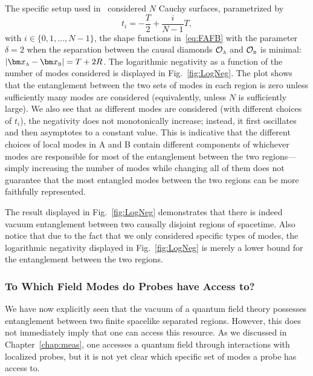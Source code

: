 \documentclass[letterpaper,12pt,titlepage,oneside,final]{book}
\newcommand{\tc}[1]{\textsc{#1}}
\begin{document}
The specific setup used in~\cite{patriciaAndI} considered $N$ Cauchy surfaces, parametrized by
\begin{equation}
    t_i = - \frac{T}{2} + \frac{i}{N-1} T,
\end{equation}
with $i\in \{0,1,...,N-1\}$, the shape functions in~\eqref{eq:FAFB} with the parameter $\delta = 2$ when the separation between the causal diamonds $\mathcal{O}_\tc{a}$ and $\mathcal{O}_\tc{b}$ is minimal: $|\bm x_\tc{a} - \bm x_\tc{b}| = T + 2R$. The logarithmic negativity as a function of the number of modes considered is displayed in Fig.~\ref{fig:LogNeg}. The plot shows that the entanglement between the two sets of modes in each region is zero unless sufficiently many modes are considered (equivalently, unless $N$ is sufficiently large). We also see that as different modes are considered (with different choices of $t_i$), the negativity does not monotonically increase; instead, it first oscillates and then asymptotes to a constant value. This is indicative that the different choices of local modes in A and B contain different components of whichever modes are responsible for most of the entanglement between the two regions---simply increasing the number of modes while changing all of them does not guarantee that the most entangled modes between the two regions can be more faithfully represented.


The result displayed in Fig.~\ref{fig:LogNeg} demonstrates that there is indeed vacuum entanglement between two causally disjoint regions of spacetime. Also notice that due to the fact that we only considered specific types of modes, the logarithmic negativity displayed in Fig.~\ref{fig:LogNeg} is merely a lower bound for the entanglement between the two regions. %

\subsubsection*{To Which Field Modes do Probes have Access to?}

We have now explicitly seen that the vacuum of a quantum field theory possesses entanglement between two finite spacelike separated regions. However, this does not immediately imply that one can access this resource. As we discussed in Chapter~\ref{chap:meas}, one accesses a quantum field through interactions with localized probes, but it is not yet clear which specific set of modes a probe has access to.
\end{document}
